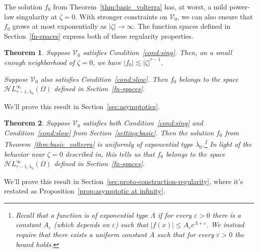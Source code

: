 \documentclass{article}
\theoremstyle{plain}
\newtheorem{thm}{Theorem}
\newcommand{\singexp}[2]{\mathcal{H}L^\infty_{#1, #2}}
\newcommand{\hardpart}{\mathcal{V}_0}
\newcommand{\solproto}{f_0}
\newcommand{\domain}{\Omega}
\begin{document}
\color{black}
The solution $\solproto$ from Theorem~\ref{thm:basic_volterra} has, at worst, a mild power-law singularity at $\zeta = 0$. With stronger constraints on $\hardpart$, we can also ensure that $\solproto$ grows at most exponentially as $|\zeta| \to \infty$. The function spaces defined in Section~\ref{fn-spaces} express both of these regularity properties.
\begin{thm}\label{thm:proto-growth}
Suppose $\hardpart$ satisfies {\em Condition~\eqref{cond:sing}}. Then, on a small enough neighborhood of $\zeta = 0$, we have $|\solproto| \lesssim |\zeta|^{\tau-1}$.

Suppose $\hardpart$ also satisfies {\em Condition~\eqref{cond:slow}}. Then $f_0$ belongs to the space $\singexp{\tau-1}{\lambda_0}(\domain)$ defined in Section~\ref{fn-spaces}.
\end{thm}
We'll prove this result in Section~\ref{sec:asymptotics}.
\color{Tomato}
\begin{thm}%
Suppose $\hardpart$ satisfies both {\em Condition~\eqref{cond:sing}} and {\em Condition~\eqref{cond:slow}} from Section~\ref{setting:basic}. Then the solution $f_0$ from {\em Theorem~\ref{thm:basic_volterra}} is uniformly of exponential type $\lambda_0$.\footnote{Recall that a function is of exponential type $\Lambda$ if for every $\varepsilon>0$ there is a constant $A_\varepsilon$ (which depends on $\varepsilon$) such that $|f(x)|\leq A_\varepsilon e^{\Lambda+\varepsilon} $. We instead require that there exists a uniform constant $A$ such that for every $\varepsilon>0$ the bound holds.} In light of the behavior near $\zeta = 0$ described in, this tells us that $f_0$ belongs to the space $\singexp{\tau-1}{\lambda_0}(\domain)$ defined in Section~\ref{fn-spaces}.
\end{thm}
We'll prove this result in Section~\ref{sec:proto-construction-regularity}, where it's restated as Proposition~\ref{prop:asymptotic at infinity}.
\color{black}
\end{document}
